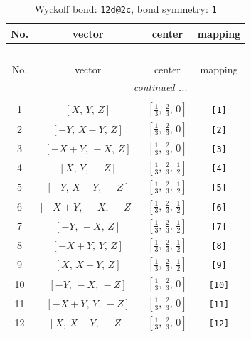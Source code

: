 \documentclass[fleqn,8pt]{jsarticle}
\begin{document}
\begin{longtable}{cccc}
\caption{Wyckoff bond: {\tt 12d@2c}, bond symmetry: {\tt 1}}
 \\
 \hline \hline
No. & vector & center & mapping \\ \hline \endfirsthead

\multicolumn{3}{l}{\tablename\ \thetable{}} \\
 \hline \hline
No. & vector & center & mapping \\ \hline \endhead

 \hline \hline
\multicolumn{3}{r}{\footnotesize\it continued ...} \\ \endfoot

 \hline \hline
\multicolumn{3}{r}{} \\ \endlastfoot

1 & $\left[ X,\, Y,\, Z \right]$ & $\left[ \frac{1}{3},\, \frac{2}{3},\, 0 \right]$ & {\tt [1]} \\ \hline
2 & $\left[ - Y,\, X - Y,\, Z \right]$ & $\left[ \frac{1}{3},\, \frac{2}{3},\, 0 \right]$ & {\tt [2]} \\ \hline
3 & $\left[ - X + Y,\, - X,\, Z \right]$ & $\left[ \frac{1}{3},\, \frac{2}{3},\, 0 \right]$ & {\tt [3]} \\ \hline
4 & $\left[ X,\, Y,\, - Z \right]$ & $\left[ \frac{1}{3},\, \frac{2}{3},\, \frac{1}{2} \right]$ & {\tt [4]} \\ \hline
5 & $\left[ - Y,\, X - Y,\, - Z \right]$ & $\left[ \frac{1}{3},\, \frac{2}{3},\, \frac{1}{2} \right]$ & {\tt [5]} \\ \hline
6 & $\left[ - X + Y,\, - X,\, - Z \right]$ & $\left[ \frac{1}{3},\, \frac{2}{3},\, \frac{1}{2} \right]$ & {\tt [6]} \\ \hline
7 & $\left[ - Y,\, - X,\, Z \right]$ & $\left[ \frac{1}{3},\, \frac{2}{3},\, \frac{1}{2} \right]$ & {\tt [7]} \\ \hline
8 & $\left[ - X + Y,\, Y,\, Z \right]$ & $\left[ \frac{1}{3},\, \frac{2}{3},\, \frac{1}{2} \right]$ & {\tt [8]} \\ \hline
9 & $\left[ X,\, X - Y,\, Z \right]$ & $\left[ \frac{1}{3},\, \frac{2}{3},\, \frac{1}{2} \right]$ & {\tt [9]} \\ \hline
10 & $\left[ - Y,\, - X,\, - Z \right]$ & $\left[ \frac{1}{3},\, \frac{2}{3},\, 0 \right]$ & {\tt [10]} \\ \hline
11 & $\left[ - X + Y,\, Y,\, - Z \right]$ & $\left[ \frac{1}{3},\, \frac{2}{3},\, 0 \right]$ & {\tt [11]} \\ \hline
12 & $\left[ X,\, X - Y,\, - Z \right]$ & $\left[ \frac{1}{3},\, \frac{2}{3},\, 0 \right]$ & {\tt [12]} \\
\end{longtable}
\end{document}

